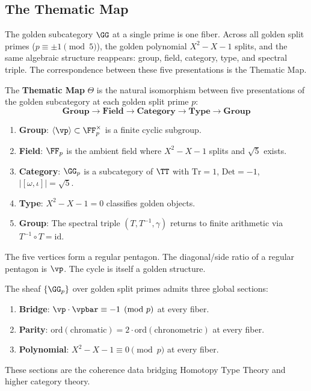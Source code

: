 \subsection{The Thematic Map}

The golden subcategory $\GG$ at a single prime is one fiber. Across all golden split primes ($p \equiv \pm 1 \pmod{5}$), the golden polynomial $X^2 - X - 1$ splits, and the same algebraic structure reappears: group, field, category, type, and spectral triple. The correspondence between these five presentations is the Thematic Map.

\begin{definition}\label{def:pentagon}
The \textbf{Thematic Map} $\Theta$ is the natural isomorphism between five presentations of the golden subcategory at each golden split prime $p$:
$$\textbf{Group} \to \textbf{Field} \to \textbf{Category} \to \textbf{Type} \to \textbf{Group}$$
\begin{enumerate}
\item \textbf{Group}: $\langle\vp\rangle \subset \FF_p^\times$ is a finite cyclic subgroup.
\item \textbf{Field}: $\FF_p$ is the ambient field where $X^2 - X - 1$ splits and $\sqrt{5}$ exists.
\item \textbf{Category}: $\GG_p$ is a subcategory of $\TT$ with $\mathrm{Tr} = 1$, $\mathrm{Det} = -1$, $|[\omega,\iota]| = \sqrt{5}$.
\item \textbf{Type}: $X^2 - X - 1 = 0$ classifies golden objects.
\item \textbf{Group}: The spectral triple $(T, T^{-1}, \gamma)$ returns to finite arithmetic via $T^{-1} \circ T = \mathrm{id}$.
\end{enumerate}
The five vertices form a regular pentagon. The diagonal/side ratio of a regular pentagon is $\vp$. The cycle is itself a golden structure.
\end{definition}

\begin{theorem}
The sheaf $\{\GG_p\}$ over golden split primes admits three global sections:
\begin{enumerate}
\item \textbf{Bridge}: $\vp \cdot \vpbar \equiv -1 \pmod{p}$ at every fiber.
\item \textbf{Parity}: $\mathrm{ord}(\text{chromatic}) = 2 \cdot \mathrm{ord}(\text{chronometric})$ at every fiber.
\item \textbf{Polynomial}: $X^2 - X - 1 \equiv 0 \pmod{p}$ at every fiber.
\end{enumerate}
These sections are the coherence data bridging Homotopy Type Theory and higher category theory.
\end{theorem}

